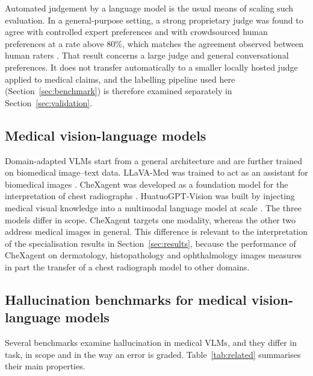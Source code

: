 Automated judgement by a language model is the usual means of scaling such evaluation. In a general-purpose setting, a strong proprietary judge was found to agree with controlled expert preferences and with crowdsourced human preferences at a rate above 80\%, which matches the agreement observed between human raters \citep{zheng2023judge}. That result concerns a large judge and general conversational preferences. It does not transfer automatically to a smaller locally hosted judge applied to medical claims, and the labelling pipeline used here (Section~\ref{sec:benchmark}) is therefore examined separately in Section~\ref{sec:validation}.

\subsection{Medical vision-language models}
\label{subsec:rw_medvlm}

Domain-adapted VLMs start from a general architecture and are further trained on biomedical image--text data. LLaVA-Med was trained to act as an assistant for biomedical images \citep{li2023llavamed}. CheXagent was developed as a foundation model for the interpretation of chest radiographs \citep{chen2024chexagent}. HuatuoGPT-Vision was built by injecting medical visual knowledge into a multimodal language model at scale \citep{chen2024huatuogptvision}. The three models differ in scope. CheXagent targets one modality, whereas the other two address medical images in general. This difference is relevant to the interpretation of the specialisation results in Section~\ref{sec:results}, because the performance of CheXagent on dermatology, histopathology and ophthalmology images measures in part the transfer of a chest radiograph model to other domains.

\subsection{Hallucination benchmarks for medical vision-language models}
\label{subsec:rw_bench}

Several benchmarks examine hallucination in medical VLMs, and they differ in task, in scope and in the way an error is graded. Table~\ref{tab:related} summarises their main properties.

